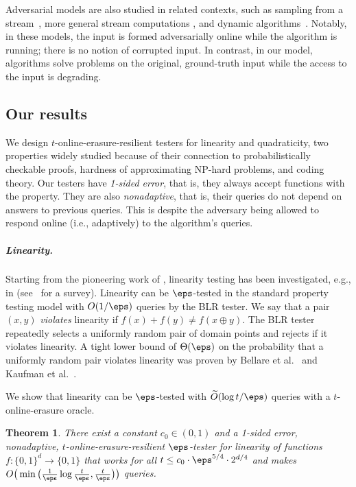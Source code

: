\documentclass[11pt]{article}
\numberwithin{equation}{section}
\newtheorem{theorem}{Theorem}[section]
\theoremstyle{definition}
\theoremstyle{plain}
\begin{document}
Adversarial models are also studied in related contexts, such as sampling from  a stream~\cite{Ben-EliezerY20}, more general stream computations \cite{Ben-EliezerJWY22}, and dynamic algorithms~\cite{BeimelKMNSS22}. 
Notably, in these models, the input is formed adversarially online while the algorithm is running; there is no notion of corrupted input. In contrast, in our model, algorithms solve problems on the original, ground-truth input while the access to the input is degrading. 




%
\subsection{Our results}\label{sec:results}

We design 
$t$-online-erasure-resilient testers for linearity and quadraticity, two properties widely studied because of their connection to probabilistically checkable proofs, %
hardness of approximating NP-hard problems, and coding theory. 
%
%
Our testers have {\em 1-sided error}, that is, they always accept functions with the property. They are also {\em nonadaptive}, that is, their queries do not depend on answers to previous queries. This is despite the adversary being allowed to respond online (i.e., adaptively) to the algorithm's queries.


\subparagraph*{Linearity.} 
%

Starting from the pioneering work of \cite{BlumLR93}, linearity testing has been investigated, e.g., in \cite{BellareGLR93, BellareS94, FeigeGLSS96, BellareCHKS96, BellareGS98, Trevisan98, SudanT98,  SamorodnitskyT00, HastadW03,Ben-SassonSVW03, Samorodnitsky07, SamorodnitskyT09, ShpilkaW06, KaufmanLX10} (see~\cite{RasR16} for a survey). 
%
%
%
%
Linearity can be $\eps$-tested in the standard property testing model with $O(1/\eps)$ queries by the BLR tester. We say that a pair $(x, y)$ \emph{violates} linearity if $f(x) + f(y) \neq f(x \oplus y)$. The BLR tester repeatedly selects 
%
a uniformly random pair of domain points and rejects if it violates linearity.
A tight lower bound of $\Theta(\eps)$ on the probability that a uniformly random pair violates linearity
was proven by Bellare et al.~\cite{BellareCHKS96} and Kaufman et al.~\cite{KaufmanLX10}.

We show that linearity can be $\eps$-tested with $\widetilde O(\log t/\eps)$ queries with a $t$-online-erasure oracle. 
\begin{theorem}
\label{thm:linearity_min}
There exist a constant $c_0 \in (0,1)$ and a 1-sided error, nonadaptive, $t$-online-erasure-resilient $\eps$-tester for linearity of functions $f\colon \{0,1\}^d \to \{0,1\}$ that  works for all $t \leq c_0\cdot\eps^{5/4} \cdot  2^{d/4}$ and makes $O\big(\min\big( \frac{1}{\eps}\log \frac{t}{\eps}, \frac t \eps\big)\big)$ queries.
\end{theorem}
\end{document}
